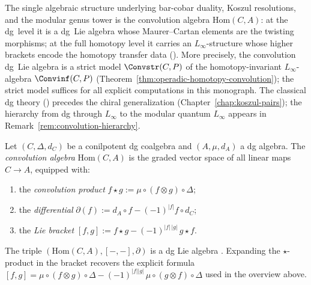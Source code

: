 The single algebraic structure underlying bar-cobar duality, Koszul
resolutions, and the modular genus tower is the convolution algebra
$\mathrm{Hom}(C, A)$: at the dg~level it is a dg~Lie algebra whose
Maurer--Cartan elements are the twisting morphisms; at the full
homotopy level it carries an $L_\infty$-structure whose higher
brackets encode the homotopy transfer data
(\cite[Theorem~10.3.8]{LV12}).
More precisely, the convolution dg~Lie algebra is a strict model
$\Convstr(C,P)$ of the homotopy-invariant $L_\infty$-algebra
$\Convinf(C,P)$
(Theorem~\ref{thm:operadic-homotopy-convolution}); the strict model
suffices for all explicit computations in this monograph.
The classical dg theory
(\cite[\S2.1--2.3]{LV12}) precedes the chiral generalization
(Chapter~\ref{chap:koszul-pairs}); the hierarchy from dg through
$L_\infty$ to the modular quantum $L_\infty$ appears in
Remark~\ref{rem:convolution-hierarchy}.

\begin{definition}
\label{def:convolution-dg-lie}
Let $(C, \Delta, d_C)$ be a conilpotent dg coalgebra and
$(A, \mu, d_A)$ a dg algebra. The \emph{convolution algebra}
$\mathrm{Hom}(C, A)$ is the graded vector space of all linear maps
$C \to A$, equipped with:
\begin{enumerate}[label=\textup{(\roman*)}]
\item the \emph{convolution product}
 $f \star g := \mu \circ (f \otimes g) \circ \Delta$;
\item the \emph{differential}
 $\partial(f) := d_A \circ f - (-1)^{|f|} f \circ d_C$;
\item the \emph{Lie bracket}
 $[f, g] := f \star g - (-1)^{|f|\,|g|}\, g \star f$.
\end{enumerate}
The triple $(\mathrm{Hom}(C, A), [-, -], \partial)$
is a dg Lie algebra \cite[Proposition~2.1.1]{LV12}.
Expanding the $\star$-product in the bracket recovers
the explicit formula
$[f, g] = \mu \circ (f \otimes g) \circ \Delta
- (-1)^{|f||g|}\, \mu \circ (g \otimes f) \circ \Delta$
used in the overview above.
\end{definition}

